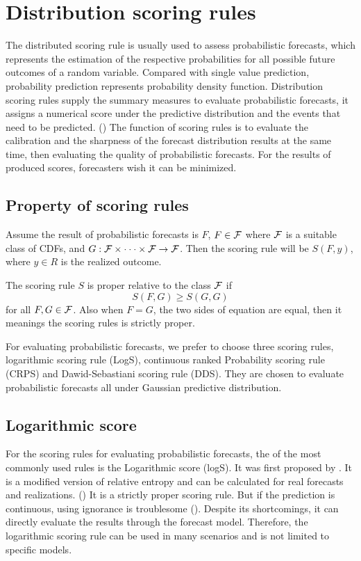 \documentclass{monashthesis}
\theoremstyle{definition}
\theoremstyle{definition}
\theoremstyle{definition}
\theoremstyle{remark}
\begin{document}
\section{Distribution scoring rules}\label{distribution-scoring-rules}

The distributed scoring rule is usually used to assess probabilistic
forecasts, which represents the estimation of the respective
probabilities for all possible future outcomes of a random variable.
Compared with single value prediction, probability prediction represents
probability density function. Distribution scoring rules supply the
summary measures to evaluate probabilistic forecasts, it assigns a
numerical score under the predictive distribution and the events that
need to be predicted. (\textcite{GBR07}) The function of scoring rules
is to evaluate the calibration and the sharpness of the forecast
distribution results at the same time, then evaluating the quality of
probabilistic forecasts. For the results of produced scores, forecasters
wish it can be minimized.

\subsection{Property of scoring rules}\label{property-of-scoring-rules}

Assume the result of probabilistic forecasts is \(F\), \(F \in \cal{F}\)
where \(\cal{F}\) is a suitable class of CDFs, and
\(G:\cal{F\times\cdot\cdot\cdot\times F\to F}\). Then the scoring rule
will be \(S(F,y)\), where \(y \in R\) is the realized outcome.

The scoring rule \(S\) is proper relative to the class \(\cal{F}\) if
\[S(F,G)\geq S(G,G)\] for all \(F,G \in \cal{F}\). Also when \(F=G\),
the two sides of equation are equal, then it meanings the scoring rules
is strictly proper.

For evaluating probabilistic forecasts, we prefer to choose three
scoring rules, logarithmic scoring rule (LogS), continuous ranked
Probability scoring rule (CRPS) and Dawid-Sebastiani scoring rule (DDS).
They are chosen to evaluate probabilistic forecasts all under Gaussian
predictive distribution.

\subsection{Logarithmic score}\label{logarithmic-score}

For the scoring rules for evaluating probabilistic forecasts, the of the
most commonly used rules is the Logarithmic score (logS). It was first
proposed by \textcite{G52}. It is a modified version of relative entropy
and can be calculated for real forecasts and realizations.
(\textcite{RS02}) It is a strictly proper scoring rule. But if the
prediction is continuous, using ignorance is troublesome
(\textcite{P10}). Despite its shortcomings, it can directly evaluate the
results through the forecast model. Therefore, the logarithmic scoring
rule can be used in many scenarios and is not limited to specific
models.
\end{document}
